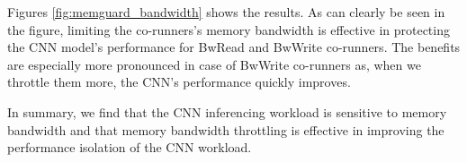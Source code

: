 Figures \ref{fig:memguard_bandwidth} shows the results.
As can clearly be seen in the figure, limiting the co-runners's memory
bandwidth is effective in protecting the CNN model's performance for
BwRead and BwWrite co-runners. The benefits are especially more
pronounced in case of BwWrite co-runners as, when we throttle them more, the
CNN's performance quickly improves.


In summary, we find that the CNN inferencing workload is sensitive to
memory bandwidth and that memory bandwidth throttling is effective in
improving the performance isolation of the CNN workload.






